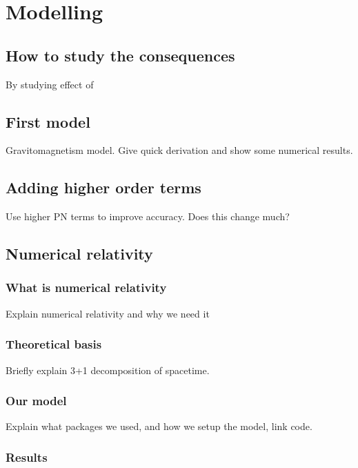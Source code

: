 \chapter{Modelling}

\section{How to study the consequences}
By studying effect of 

\section{First model}

Gravitomagnetism model. Give quick derivation and show some numerical results.

\section{Adding higher order terms}
Use higher PN terms to improve accuracy. Does this change much?

\section{Numerical relativity}
\subsection{What is numerical relativity}
Explain numerical relativity and why we need it

\subsection{Theoretical basis}
Briefly explain 3+1 decomposition of spacetime.

\subsection{Our model}

Explain what packages we used, and how we setup the model, link code.

\subsection{Results}